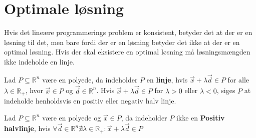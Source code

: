\section{Optimale løsning}
\label{sec:eksistens}
Hvis det lineære programmerings problem er konsistent, betyder det at der er en løsning til det, men bare fordi der er en løsning betyder det ikke at der er en optimal løsning.
Hvis der skal eksistere en optimal løsning må løsningsmængden ikke indeholde en linje.
\begin{defn}[Linje]
Lad $P\subseteq \mathds{R}^n $ være en polyede, da indeholder $P$ en \textbf{linje}, hvis $\vec{x}+\lambda\vec{d} \in P$ for alle $\lambda \in \mathds{R}_+$, hvor $\vec{x}\in P$ og $\vec{d} \in \mathds{R}^n$. Hvis $\vec{x}+\lambda\vec{d} \in P$ for $\lambda > 0$ eller $\lambda < 0$, siges $P$ at indeholde henholdsvis en positiv eller negativ halv linje.
\label{def:linje}
\end{defn}

\begin{defn} [Linje v2]
Lad $P\subseteq \mathds{R}^n $ være en polyede og $\vec{x} \in P$, da indeholder $P$ ikke en \textbf{Positiv halvlinje}, hvis $\forall \vec{d} \in \mathds{R}^n \nexists \lambda \in \mathds{R}_+ : \vec{x}+\lambda \vec{d} \in P$
\end{defn}

